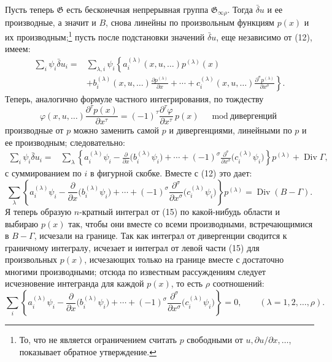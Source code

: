 \documentclass[11pt]{article}
\providecommand{\G}{\mathfrak G}
\providecommand{\p}{\partial}
\DeclareMathOperator{\Div}{Div}
\providecommand{\bd}{\bar{\delta}}
\begin{document}
Пусть теперь \(\G\) есть бесконечная непрерывная группа \(\G_{\infty\rho}\). Тогда \(\bd u\) и ее производные, а значит и \(B\), снова линейны по произвольным функциям \(p(x)\) и их производным;\footnote{То, что не является ограничением считать \(p\) свободными от \(u,\p u/\p x,\ldots\), показывает обратное утверждение.} пусть после подстановки значений \(\bd u\), еще независимо от (12), имеем:
\[
\begin{aligned}
\sum_i\psi_i\bd u_i
={}&\sum_{\lambda,i}\psi_i\left\{
a_i^{(\lambda)}(x,u,\ldots)p^{(\lambda)}(x)\right.\\
&\left.
+b_i^{(\lambda)}(x,u,\ldots)\frac{\p p^{(\lambda)}}{\p x}
+\cdots+c_i^{(\lambda)}(x,u,\ldots)
\frac{\p^\sigma p^{(\lambda)}}{\p x^\sigma}\right\}.
\end{aligned}
\]
Теперь, аналогично формуле частного интегрирования, по тождеству
\[
\varphi(x,u,\ldots)\frac{\p^\tau p(x)}{\p x^\tau}
=(-1)^\tau\frac{\p^\tau\varphi}{\p x^\tau}\,p(x)
\quad \bmod \text{дивергенций}
\]
производные от \(p\) можно заменить самой \(p\) и дивергенциями, линейными по \(p\) и ее производным; следовательно:
\begin{equation}
\begin{aligned}
\sum_i\psi_i\bd u_i
={}&\sum_\lambda\left\{
a_i^{(\lambda)}\psi_i-\frac{\p}{\p x}\bigl(b_i^{(\lambda)}\psi_i\bigr)
+\cdots+(-1)^\sigma
\frac{\p^\sigma}{\p x^\sigma}\bigl(c_i^{(\lambda)}\psi_i\bigr)
\right\}p^{(\lambda)}+\Div\Gamma,
\end{aligned}
\tag{14}
\end{equation}
с суммированием по \(i\) в фигурной скобке. Вместе с (12) это дает:
\begin{equation}
\sum_\lambda\left\{
a_i^{(\lambda)}\psi_i-\frac{\p}{\p x}\bigl(b_i^{(\lambda)}\psi_i\bigr)
+\cdots+(-1)^\sigma
\frac{\p^\sigma}{\p x^\sigma}\bigl(c_i^{(\lambda)}\psi_i\bigr)
\right\}p^{(\lambda)}
=\Div(B-\Gamma).
\tag{15}
\end{equation}
Я теперь образую \(n\)-кратный интеграл от (15) по какой-нибудь области и выбираю \(p(x)\) так, чтобы они вместе со всеми производными, встречающимися в \(B-\Gamma\), исчезали на границе. Так как интеграл от дивергенции сводится к граничному интегралу, исчезает и интеграл от левой части (15) для произвольных \(p(x)\), исчезающих только на границе вместе с достаточно многими производными; отсюда по известным рассуждениям следует исчезновение интегранда для каждой \(p(x)\), то есть \(\rho\) соотношений:
\begin{equation}
\sum_i\left\{
a_i^{(\lambda)}\psi_i-\frac{\p}{\p x}\bigl(b_i^{(\lambda)}\psi_i\bigr)
+\cdots+(-1)^\sigma
\frac{\p^\sigma}{\p x^\sigma}\bigl(c_i^{(\lambda)}\psi_i\bigr)
\right\}=0,\qquad(\lambda=1,2,\ldots,\rho).
\tag{16}
\end{equation}
\end{document}
